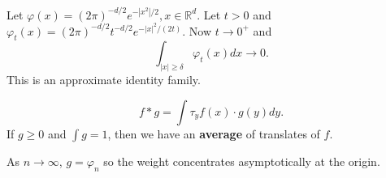 \documentclass[11pt]{scrartcl}
\newcommand{\R}{\mathbb{R}}
\let \phi \varphi
\newcommand{\<}{\langle}
\renewcommand{\>}{\rangle}
\begin{document}
\begin{example} Let $\phi(x) = (2\pi)^{-d/2}e^{-|x^2|/2}, x \in \R^d$.  Let $t > 0$ and $\phi_t(x) = (2\pi)^{-d/2} t^{-d/2} e^{-|x|^2/(2t)}$.  Now $t \rightarrow 0^+$ and 
$$\int_{|x|\ge \delta} \phi_t(x)dx \rightarrow 0.$$ 
This is an approximate identity family.
\end{example}
\begin{example}[Interpretation of $f*g$]
$$f * g = \int \tau_y f(x) \cdot g(y)dy.$$
If $g \ge 0$ and $\int g = 1$, then we have an \textbf{average} of translates of $f$.

As $n \rightarrow \infty$, $g = \phi_n$ so the weight concentrates asymptotically at the origin.
\end{example}
\end{document}
